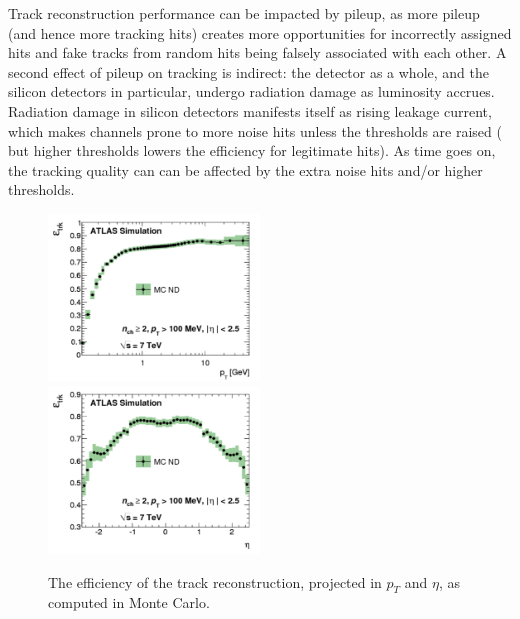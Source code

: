 Track reconstruction performance can be impacted by pileup, as more pileup (and hence more tracking hits) creates 
more opportunities for incorrectly assigned hits and fake tracks from random hits being falsely associated with each other.  A 
second effect of pileup on tracking is indirect: the detector as a whole, and the silicon detectors in 
particular, undergo radiation damage as luminosity accrues.  Radiation damage in silicon detectors manifests 
itself as rising leakage current, which makes channels prone to more noise hits unless the thresholds are raised (
but higher thresholds lowers the efficiency for legitimate hits).  As time goes on, the tracking quality can can 
be affected by the extra noise hits and/or higher thresholds.

\begin{figure}
	\includegraphics[width=0.5\textwidth]{ReconstructionPerformance/images/track_perf1.pdf}
	\includegraphics[width=0.5\textwidth]{ReconstructionPerformance/images/track_perf2.pdf}
	\label{fig:track_perfA}  
	\caption{The efficiency of the track reconstruction, projected in $p_T$ and $\eta$, as computed in Monte Carlo.}
\end{figure}



